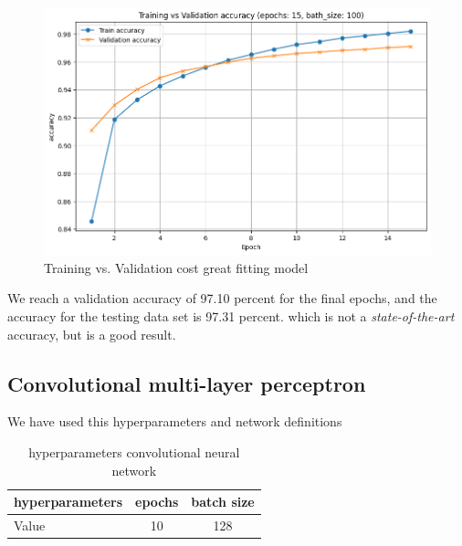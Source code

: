 \documentclass[a4paper, twocolumn, twoside]{article}
\begin{document}
	\begin{figure}[H]
		\begin{center}
			\includegraphics[width=\columnwidth]{images/accuracy_greatfit.png}
		\end{center}
		\caption{Training vs. Validation cost great fitting model}\label{fig:accuracy_greatfit}
	\end{figure}
	We reach a validation accuracy of 97.10 percent for the final epochs, and the accuracy for the testing data set is 97.31 percent.
	which is not a \textit{state-of-the-art} accuracy, but is a good result.
	\subsection{Convolutional multi-layer perceptron}

    We have used this hyperparameters and network definitions
    \begin{table}[H]
	\centering
	\begin{tabular}{|l|c|c|}
	\hline
	hyperparameters & epochs & batch size  \\
	\hline
	Value & 10 & 128   \\
	\hline
	\end{tabular}
	\caption{hyperparameters convolutional neural network}
	\end{table}
\end{document}
